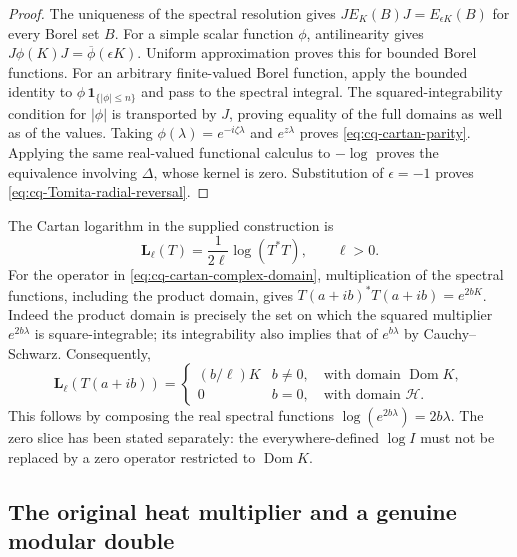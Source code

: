 \begin{proof}
The uniqueness of the spectral resolution gives
$JE_K(B)J=E_{\epsilon K}(B)$ for every Borel set $B$.
For a simple scalar function $\phi$, antilinearity gives
$J\phi(K)J=\overline\phi(\epsilon K)$.
Uniform approximation proves this for bounded Borel functions.
For an arbitrary finite-valued Borel function, apply the bounded
identity to $\phi\,\mathbf1_{\{|\phi|\leq n\}}$ and pass to the
spectral integral. The squared-integrability condition for
$|\phi|$ is transported by $J$, proving equality of the full
domains as well as of the values. Taking
$\phi(\lambda)=e^{-i\zeta\lambda}$ and $e^{z\lambda}$ proves
\eqref{eq:cq-cartan-parity}. Applying the same real-valued
functional calculus to $-\log$ proves the equivalence involving
$\Delta$, whose kernel is zero. Substitution of $\epsilon=-1$
proves \eqref{eq:cq-Tomita-radial-reversal}.
\end{proof}

The Cartan logarithm in the supplied construction is
\[
 \mathbf L_\ell(T)=\frac{1}{2\ell}\log(T^*T),\qquad \ell>0.
\]
For the operator in \eqref{eq:cq-cartan-complex-domain}, multiplication
of the spectral functions, including the product domain, gives
$T(a+ib)^*T(a+ib)=e^{2bK}$. Indeed the product domain is precisely
the set on which the squared multiplier $e^{2b\lambda}$ is
square-integrable; its integrability also implies that of
$e^{b\lambda}$ by Cauchy--Schwarz. Consequently,
\begin{equation}
 \mathbf L_\ell(T(a+ib))=
 \begin{cases}
 (b/\ell)K & b\ne0,\quad\text{with domain }\operatorname{Dom}K,\\
 0 & b=0,\quad\text{with domain }\mathscr H.
 \end{cases}
 \label{eq:cq-cartan-log-domain}
\end{equation}
This follows by composing the real spectral functions
$\log(e^{2b\lambda})=2b\lambda$. The zero slice has been stated
separately: the everywhere-defined $\log I$ must not be replaced
by a zero operator restricted to $\operatorname{Dom}K$.

\subsection{The original heat multiplier and a genuine modular double}

